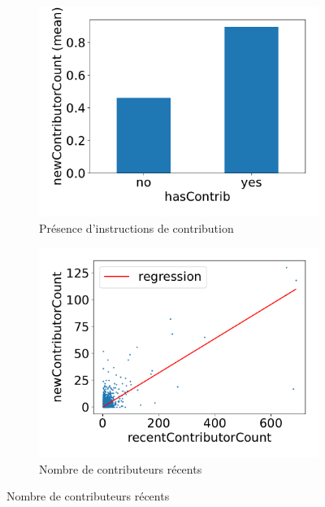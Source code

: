 \documentclass[dvipsnames,runningheads]{llncs}
\begin{document}
    \begin{figure}
        \centering
        \begin{subfigure}[t]{0.333\textwidth}
            \includegraphics[width=\textwidth]{../experiment/data_analysis/hasContrib_meanNewContributorCount}
            \caption{Présence d'instructions de contribution}
            \label{fig:hasContrib}
        \end{subfigure}%
        \begin{subfigure}[t]{0.333\textwidth}
            \includegraphics[width=\textwidth]{../experiment/data_analysis/recentContributorCountRegression_linearScale}
            \caption{Nombre de contributeurs récents}
            \label{fig:recentContributors}

\end{subfigure}
\end{figure}
\end{document}
